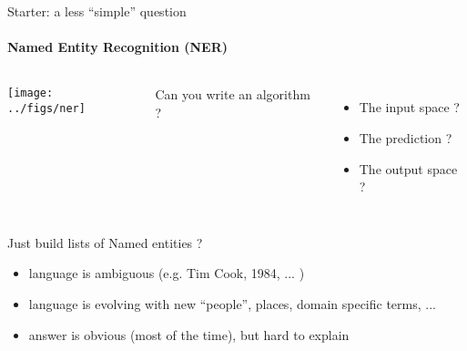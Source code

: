 \begin{frame}{Starter: a less ``simple'' question}
  \framesubtitle{Named Entity Recognition (NER)}
  \begin{columns}
      \begin{center}
        \texttt{[image: ../figs/ner]}
      \end{center}
      Can you write an algorithm ?
      \begin{itemize}
      \item The input space ? 
      \item The prediction ? \\  %
      \item The output space ?\\ %
      \end{itemize}
    \end{columns}\pause
    \begin{block}{Just build lists of Named entities ?} 
      \begin{itemize}
      \item language is ambiguous (e.g. Tim Cook, 1984, ... )
      \item language is evolving with new ``people'', places, domain specific terms, ...
      \item answer is obvious (most of the time), but hard to explain
     \end{itemize}
  \end{block}
\end{frame}


